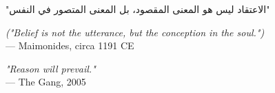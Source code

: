 \begin{flushright}
    \textarabic{"الاعتقاد ليس هو المعنى المقصود، بل المعنى المتصور في النفس"}

\vspace{0.3em}
\emph{("Belief is not the utterance, but the conception in the soul.")}\\
— Maimonides, circa 1191 CE
\end{flushright}

\vspace{2em}

\begin{flushright}
\emph{"Reason will prevail."}\\
— The Gang, 2005
\end{flushright}

